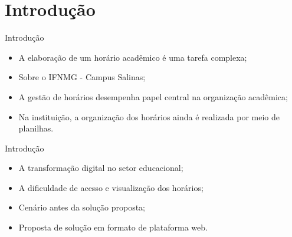 \section{Introdução}

\begin{frame}{Introdução}
	\begin{itemize}
		\item A elaboração de um horário acadêmico é uma tarefa complexa; \vspace{0.5cm}
		\item Sobre o IFNMG - Campus Salinas; \vspace{0.5cm}
		\item A gestão de horários desempenha papel central na organização acadêmica; \vspace{0.5cm}
		\item Na instituição, a organização dos horários ainda é realizada por meio de planilhas. \vspace{0.5cm}
	\end{itemize}
\end{frame}

\begin{frame}{Introdução}
	\begin{itemize}
		\item A transformação digital no setor educacional; \vspace{0.5cm}
		\item A dificuldade de acesso e visualização dos horários; \vspace{0.5cm}
		\item Cenário antes da solução proposta; \vspace{0.5cm}
		\item Proposta de solução em formato de plataforma web. \vspace{0.5cm}
	\end{itemize}
\end{frame}